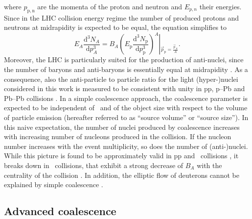 \documentclass[a4paper,11pt]{scrartcl}
\begin{document}
\noindent where $p_{\mathrm{p,n}}$ are the momenta of the proton and neutron and $E_{p,n}$ their energies.
Since in the LHC collision energy regime the number of produced protons and neutrons at midrapidity is expected to be equal, the equation simplifies to 
\begin{equation}
E_{A}\frac{\mathrm{d}^{3}N_{A}}{\mathrm{d}p_{A}^{3}}=B_{A}{\left(E_{\mathrm{p}}\frac{\mathrm{d}^{3}N_{\mathrm{p}}}{\mathrm{d}p_{\mathrm{p}}^{3}}\right)^{A}}\left\vert_{\vec{p}_{\mathrm{p}}=\frac{\vec{p}_{A}}{A}} \right..
\label{eq:BA}
\end{equation}
%
Moreover, the LHC is particularly suited for the production of anti-nuclei, since the number of baryons and anti-baryons is essentially equal at midrapidity \cite{Abbas:2013rua}. As a consequence, also the anti-particle to particle ratio for the light (hyper-)nuclei considered in this work is measured to be consistent with unity in pp, p--Pb and Pb--Pb collisions \cite{ALICE:nucleipp2017, anielski-HQ14, Acharya:2017dmc, Adam:2015yta}.
In a simple coalescence approach, the coalescence parameter is expected to be independent of \pt~and of the object size with respect to the volume of particle emission (hereafter referred to as ``source volume'' or ``source size'').
In this naive expectation, the number of nuclei produced by coalescence increases with increasing number of nucleons produced in the collision. If the nucleon number increases with the event multiplicity, so does the number of (anti-)nuclei. 
While this picture is found to be approximately valid in pp and \pPb~collisions \cite{ALICE:nucleipp2017, anielski-HQ14}, it breaks down in \PbPb~collisions, that exhibit a strong decrease of $B_{A}$ with the centrality of the collision \cite{ALICE:deuteronppPbPb2015}. 
In addition, the elliptic flow of deuterons cannot be explained by simple coalescence \cite{Acharya:2017dmc}. 


\subsection{Advanced coalescence}
\label{subsec:FullCoalescence}
\end{document}
